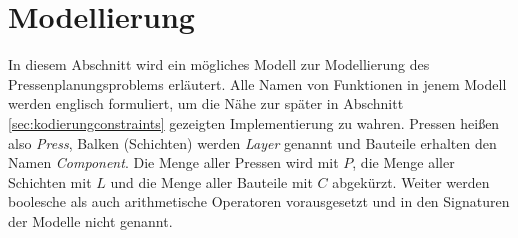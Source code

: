 \section{Modellierung}
\label{sec:modellierung}
In diesem Abschnitt wird ein mögliches Modell zur Modellierung des Pressenplanungsproblems erläutert.
Alle Namen von Funktionen in jenem Modell werden englisch formuliert, um die Nähe zur später in Abschnitt \ref{sec:kodierungconstraints} gezeigten Implementierung zu wahren.
Pressen heißen also \textit{Press}, Balken (Schichten) werden \textit{Layer} genannt und Bauteile erhalten den Namen \textit{Component}.
Die Menge aller Pressen wird mit $P$, die Menge aller Schichten mit $L$ und die Menge aller Bauteile mit $C$ abgekürzt.
Weiter werden boolesche als auch arithmetische Operatoren vorausgesetzt und in den Signaturen der Modelle nicht genannt.

